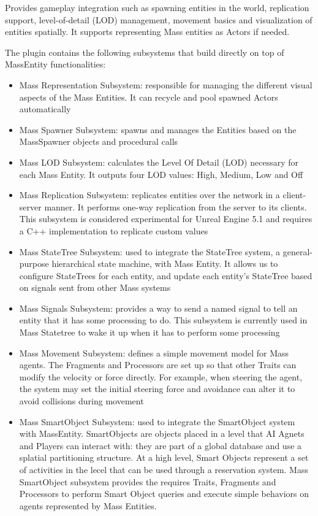 Provides gameplay integration such as spawning entities in the world, replication support, level-of-detail (LOD) management, movement basics and visualization of entities spatially. It supports representing Mass entities as Actors if needed.

The plugin contains the following subsystems that build directly on top of MassEntity functionalities:

\begin{itemize}
    \item Mass Representation Subsystem: responsible for managing the different visual aspects of the Mass Entities. It can recycle and pool spawned Actors automatically
    \item Mass Spawner Subsystem: spawns and manages the Entities based on the MassSpawner objects and procedural calls
    \item Mass LOD Subsystem: calculates the Level Of Detail (LOD) necessary for each Mass Entity. It outputs four LOD values: High, Medium, Low and Off
    \item Mass Replication Subsystem: replicates entities over the network in a client-server manner. It performs one-way replication from the server to its clients. This subsystem is considered experimental for Unreal Engine 5.1 and requires a C++ implementation to replicate custom values
    \item Mass StateTree Subsystem: used to integrate the StateTree system, a general-purpose hierarchical state machine, with Mass Entity. It allows us to configure StateTrees for each entity, and update each entity’s StateTree based on signals sent from other Mass systems
    \item Mass Signals Subsystem: provides a way to send a named signal to tell an entity that it has some processing to do. This subsystem is currently used in Mass Statetree to wake it up when it has to perform some processing
    \item Mass Movement Subsystem: defines a simple movement model for Mass agents. The Fragments and Processors are set up so that other Traits can modify the velocity or force directly. For example, when steering the agent, the system may set the initial steering force and avoidance can alter it to avoid collisions during movement
    \item Mass SmartObject Subsystem: used to integrate the SmartObject system with MassEntity. SmartObjects are objects placed in a level that AI Agnets and Players can interact with: they are part of a global  database and use a splatial partitioning structure. At a high level, Smart Objects represent a set of activities in the lecel that can be used through a reservation system. Mass SmartObject subsystem provides the requires Traits, Fragments and Processors to perform Smart Object queries and execute simple behaviors on agents represented by Mass Entities.
\end{itemize}

